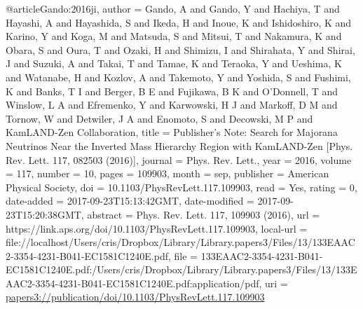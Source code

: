 {{@article{Gando:2016ji,
author = {Gando, A and Gando, Y and Hachiya, T and Hayashi, A and Hayashida, S and Ikeda, H and Inoue, K and Ishidoshiro, K and Karino, Y and Koga, M and Matsuda, S and Mitsui, T and Nakamura, K and Obara, S and Oura, T and Ozaki, H and Shimizu, I and Shirahata, Y and Shirai, J and Suzuki, A and Takai, T and Tamae, K and Teraoka, Y and Ueshima, K and Watanabe, H and Kozlov, A and Takemoto, Y and Yoshida, S and Fushimi, K and Banks, T I and Berger, B E and Fujikawa, B K and O{\textquoteright}Donnell, T and Winslow, L A and Efremenko, Y and Karwowski, H J and Markoff, D M and Tornow, W and Detwiler, J A and Enomoto, S and Decowski, M P and {KamLAND-Zen Collaboration}},
title = {{Publisher{\textquoteright}s Note: Search for Majorana Neutrinos Near the Inverted Mass Hierarchy Region with KamLAND-Zen [Phys. Rev. Lett. 117, 082503 (2016)]}},
journal = {Phys. Rev. Lett.},
year = {2016},
volume = {117},
number = {10},
pages = {109903},
month = sep,
publisher = {American Physical Society},
doi = {10.1103/PhysRevLett.117.109903},
read = {Yes},
rating = {0},
date-added = {2017-09-23T15:13:42GMT},
date-modified = {2017-09-23T15:20:38GMT},
abstract = {Phys. Rev. Lett. 117, 109903 (2016)},
url = {https://link.aps.org/doi/10.1103/PhysRevLett.117.109903},
local-url = {file://localhost/Users/cris/Dropbox/Library/Library.papers3/Files/13/133EAAC2-3354-4231-B041-EC1581C1240E.pdf},
file = {{133EAAC2-3354-4231-B041-EC1581C1240E.pdf:/Users/cris/Dropbox/Library/Library.papers3/Files/13/133EAAC2-3354-4231-B041-EC1581C1240E.pdf:application/pdf}},
uri = {\url{papers3://publication/doi/10.1103/PhysRevLett.117.109903}}
}

}}
